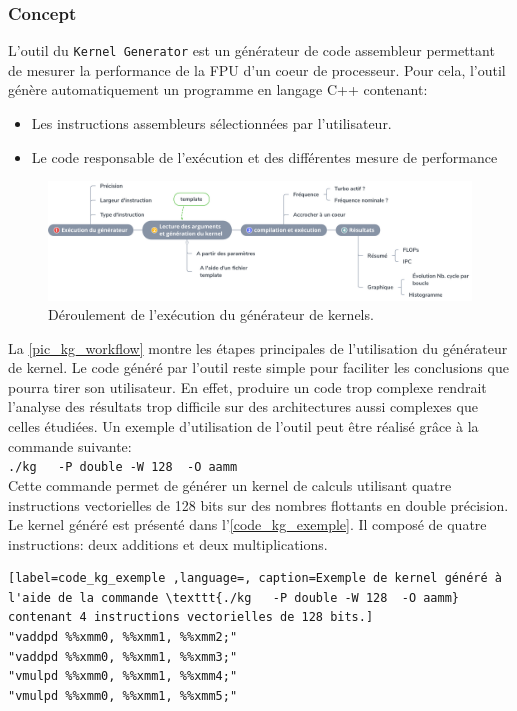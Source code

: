     \subsubsection{Concept}
        L'outil du \verb=Kernel Generator= est un générateur de code assembleur permettant de mesurer la performance de la FPU d'un coeur de processeur. Pour cela, l'outil génère automatiquement un programme en langage C++ contenant:
        \begin{itemize}
            \item Les instructions assembleurs sélectionnées par l'utilisateur. 
            \item Le code responsable de l'exécution et des différentes mesure de performance
        \end{itemize}
                    \begin{figure}
            \center
            \includegraphics[width=17cm]{images/kg_workflow.png}
            \caption{\label{pic_kg_workflow} Déroulement de l'exécution du générateur de kernels.}
            \end{figure}
        La \autoref{pic_kg_workflow} montre les étapes principales de l'utilisation du générateur de kernel. Le code généré par l'outil reste simple pour faciliter les conclusions que pourra tirer son utilisateur. En effet, produire un code trop complexe rendrait l'analyse des résultats trop difficile sur des  architectures aussi complexes que celles étudiées. Un exemple d'utilisation de l'outil peut être réalisé grâce à la commande suivante:\\
        \verb|./kg   -P double -W 128  -O aamm|\\
        Cette commande permet de générer un kernel de calculs utilisant quatre instructions vectorielles de 128 bits sur des nombres flottants en double précision. Le kernel généré est présenté dans l'\autoref{code_kg_exemple}. Il composé de quatre instructions: deux additions et deux multiplications.
        
\begin{minipage}{0.97\linewidth}
\begin{lstlisting}[label=code_kg_exemple ,language=, caption=Exemple de kernel généré à l'aide de la commande \texttt{./kg   -P double -W 128  -O aamm} contenant 4 instructions vectorielles de 128 bits.]
"vaddpd %%xmm0, %%xmm1, %%xmm2;"
"vaddpd %%xmm0, %%xmm1, %%xmm3;"
"vmulpd %%xmm0, %%xmm1, %%xmm4;"
"vmulpd %%xmm0, %%xmm1, %%xmm5;"
\end{lstlisting} 
\end{minipage}

